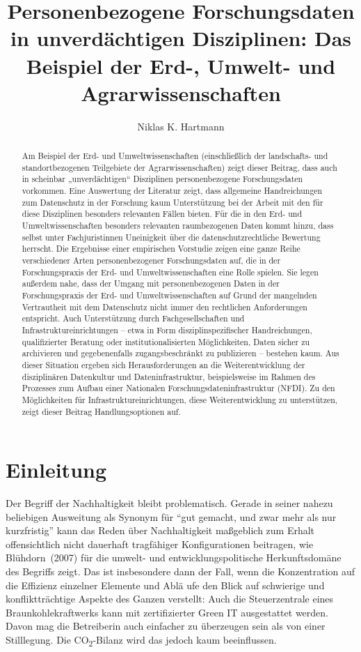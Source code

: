 \documentclass[a4paper,
fontsize=11pt,
oneside,
numbers=noperiodatend,
parskip=half-,
bibliography=totoc,
final
]{scrartcl}
\title{\LARGE{Personenbezogene Forschungsdaten in unverdächtigen Disziplinen: Das Beispiel der Erd-, Umwelt- und Agrarwissenschaften}} %
\author{Niklas K. Hartmann} %
\date{}
\begin{document}
\maketitle
\thispagestyle{fancyplain} 

\begin{abstract}
\noindent
Am Beispiel der Erd- und Umweltwissenschaften (einschließlich der
landschafts- und standortbezogenen Teilgebiete der Agrarwissenschaften)
zeigt dieser Beitrag, dass auch in scheinbar „unverdächtigen``
Disziplinen personenbezogene Forschungsdaten vorkommen. Eine Auswertung
der Literatur zeigt, dass allgemeine Handreichungen zum Datenschutz in
der Forschung kaum Unterstützung bei der Arbeit mit den für diese
Disziplinen besonders relevanten Fällen bieten. Für die in den Erd- und
Umweltwissenschaften besonders relevanten raumbezogenen Daten kommt
hinzu, dass selbst unter Fachjuristinnen Uneinigkeit über die
datenschutzrechtliche Bewertung herrscht. Die Ergebnisse einer
empirischen Vorstudie zeigen eine ganze Reihe verschiedener Arten
personenbezogener Forschungsdaten auf, die in der Forschungspraxis der
Erd- und Umweltwissenschaften eine Rolle spielen. Sie legen außerdem
nahe, dass der Umgang mit personenbezogenen Daten in der
Forschungspraxis der Erd- und Umweltwissenschaften auf Grund der
mangelnden Vertrautheit mit dem Datenschutz nicht immer den rechtlichen
Anforderungen entspricht. Auch Unterstützung durch Fachgesellschaften
und Infrastruktureinrichtungen -- etwa in Form disziplinspezifischer
Handreichungen, qualifizierter Beratung oder institutionalisierten
Möglichkeiten, Daten sicher zu archivieren und gegebenenfalls
zugangsbeschränkt zu publizieren -- bestehen kaum. Aus dieser Situation
ergeben sich Herausforderungen an die Weiterentwicklung der
disziplinären Datenkultur und Dateninfrastruktur, beispielsweise im
Rahmen des Prozesses zum Aufbau einer Nationalen
Forschungsdateninfrastruktur (NFDI). Zu den Möglichkeiten für
Infrastruktureinrichtungen, diese Weiterentwicklung zu unterstützen,
zeigt dieser Beitrag Handlungsoptionen auf.
\end{abstract}

\hypertarget{einleitung}{%
\section{Einleitung}\label{einleitung}}

Der Begriff der Nachhaltigkeit bleibt problematisch. Gerade in seiner
nahezu beliebigen Ausweitung als Synonym für \enquote{gut gemacht, und
zwar mehr als nur kurzfristig} kann das Reden über Nachhaltigkeit
maßgeblich zum Erhalt offensichtlich nicht dauerhaft tragfähiger
Konfigurationen beitragen, wie Blühdorn~(2007) für die umwelt- und
entwicklungspolitische Herkunftsdomäne des Begriffs zeigt. Das ist
insbesondere dann der Fall, wenn die Konzentration auf die Effizienz
einzelner Elemente und Ablä ufe den Blick auf schwierige und
konfliktträchtige Aspekte des Ganzen verstellt: Auch die Steuerzentrale
eines Braunkohlekraftwerks kann mit zertifizierter Green IT ausgestattet
werden. Davon mag die Betreiberin auch einfacher zu überzeugen sein als
von einer Stilllegung. Die CO\textsubscript{2}-Bilanz wird das jedoch
kaum beeinflussen.
\end{document}
